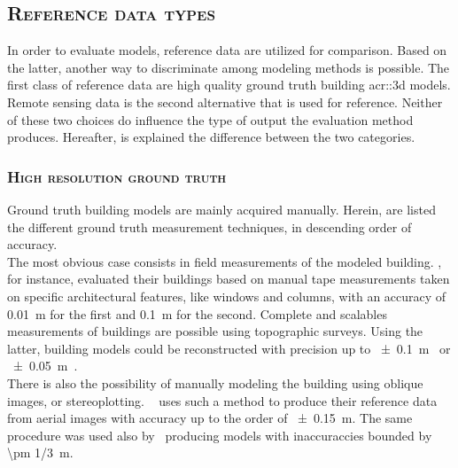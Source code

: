     \subsection{\textsc{Reference data types}}
        \label{subsec::state_of_the_art::quality::reference}
        In order to evaluate models, reference data are utilized for comparison.
        Based on the latter, another way to discriminate among modeling methods is possible.
        The first class of reference data are high quality ground truth building \gls{acr::3d} models.
        Remote sensing data is the second alternative that is used for reference.
        Neither of these two choices do influence the type of output the evaluation method produces.
        Hereafter, is explained the difference between the two categories.

        \subsubsection{\textsc{High resolution ground truth}}
            Ground truth building models are mainly acquired manually.
            Herein, are listed the different ground truth measurement techniques, in descending order of accuracy.\\

            The most obvious case consists in field measurements of the modeled building.
            \textcite{dick2004modelling}, for instance, evaluated their buildings based on manual tape measurements taken on specific architectural features, like windows and columns, with an accuracy of \SI{0.01}{\m} for the first and \SI{0.1}{\m} for the second.
            Complete and scalables measurements of buildings are possible using topographic surveys.
            Using the latter, building models could be reconstructed with precision up to \SI{\pm 0.1}{\m}~\parencite{henricsson19973} or \SI{\pm 0.05}{\m}~\parencite{vogtle2003quality}.\\
            There is also the possibility of manually modeling the building using oblique images, or stereoplotting.
            ~\textcite{zebedin2008fusion} uses such a method to produce their reference data from aerial images with accuracy up to the order of \SI{\pm 0.15}{\m}.
            The same procedure was used also by~\textcite{jaynes2003recognition} producing models with inaccuraccies bounded by \SI{\pm 1/3}{\m}.

